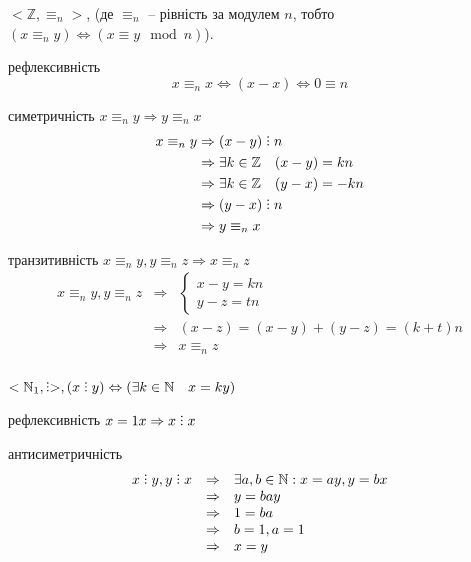 \begin{example}%
    $<\mathbb{Z}, \equiv_{n}>$, (де $\equiv_{n}$ -- рівність за модулем $n$,
    тобто $(x \equiv_{n} y) \Leftrightarrow (x \equiv y \mod n)$).

    рефлексивність
    $$x \equiv_{n} x \Leftrightarrow (x - x) \Leftrightarrow 0 \equiv n$$
    
    симетричність $x \equiv_{n} y \Rightarrow y \equiv_{n} x$
    \begin{equation*}
        \begin{split}
            x \equiv_{n} y
            & \Rightarrow (x - y) \divby n  \\
            & \Rightarrow \exists k \in \mathbb{Z} \quad (x - y) = kn  \\
            & \Rightarrow \exists k \in \mathbb{Z} \quad (y-x) = -kn  \\
            & \Rightarrow (y-x) \divby n  \\
            & \Rightarrow y \equiv_{n} x
        \end{split}
    \end{equation*}
    
    транзитивність $x \equiv_{n} y, y \equiv_{n} z \Rightarrow x \equiv_{n} z$
    $$\begin{array}{rcl}
        x \equiv_{n} y, y \equiv_{n} z
        & \Rightarrow & \left\{ \begin{array}{l}
                x-y = kn \\
                y - z = tn
            \end{array} \right. \\
        & \Rightarrow & (x - z) = (x - y) + (y - z) = (k + t)n  \\
        & \Rightarrow & x \equiv_{n} z  \\
    \end{array}$$%
\end{example}

\begin{example}
    $<\mathbb{N}_1, \divby>, (x \divby y) \Leftrightarrow (\exists k \in \mathbb{N} \quad x = ky)$

    рефлексивність $x = 1x \Rightarrow x \divby x$
    
    антисиметричність
    $$\begin{array}{rcl}
        x \divby y, y \divby x
        & \Rightarrow  & \exists a, b \in \mathbb{N}: x = ay, y = bx  \\
        & \Rightarrow  & y = bay  \\
        & \Rightarrow  & 1 = ba  \\
        & \Rightarrow  & b = 1, a = 1  \\
        & \Rightarrow  & x = y  \\
    \end{array}$$
\end{example}


